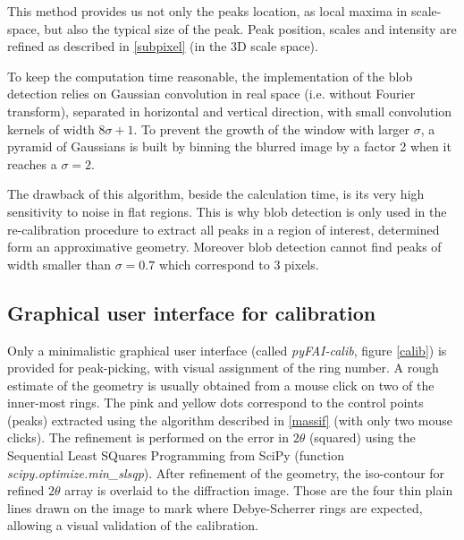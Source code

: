 \documentclass[preprint]{iucr}
\begin{document}
This method provides us not only the peaks location, as local maxima in
scale-space, but also the typical size of the peak.
Peak position, scales and intensity are refined as described in
\ref{subpixel} (in the 3D scale space).

To keep the computation time reasonable, the implementation of the blob
detection relies on Gaussian convolution in real space (i.e. without Fourier
transform), separated in horizontal and vertical direction, with small
convolution kernels of width $8 \sigma +1$.
To prevent the growth of the window with larger $\sigma$, a pyramid of Gaussians
is built by binning the blurred image by a factor 2 when it reaches a
$\sigma=2$.

The drawback of this algorithm, beside the calculation time, is its very high
sensitivity to noise in flat regions.
This is why blob detection is only used in the re-calibration procedure to
extract all peaks in a region of interest, determined form an
approximative geometry.
Moreover blob detection cannot find peaks of width smaller than
$\sigma=0.7$ which correspond to 3 pixels.


\subsection{Graphical user interface for calibration}
\label{gui_calib}
Only a minimalistic graphical user interface (called
\textit{pyFAI-calib}, figure \ref{calib}) is provided
for peak-picking, with visual assignment of the ring number.
A rough estimate of the geometry is usually obtained from a mouse click on
two of the inner-most rings.
The pink and yellow dots correspond to the control points (peaks) extracted
using the algorithm described in \ref{massif} (with only two mouse clicks).
The refinement is performed on the error in $2\theta$ (squared) using the
Sequential Least SQuares Programming  from
SciPy (function \textit{scipy.optimize.min\_slsqp}).
After refinement of the geometry, the iso-contour for refined $2\theta$ array is
overlaid to the diffraction image. Those are the four thin plain lines drawn on
the image to mark where Debye-Scherrer rings are expected, allowing a visual
validation of the calibration.
\end{document}
